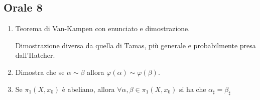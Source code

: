 \documentclass[]{article}
\begin{document}
\subsection{Orale 8}
\begin{enumerate}
    \item Teorema di Van-Kampen con enunciato e dimostrazione.
    \begin{answer}
        Dimostrazione diversa da quella di Tamas, pi\`u generale e probabilmente presa dall'Hatcher.
    \end{answer}
    \item Dimostra che se $\alpha \sim \beta$ allora $\varphi(\alpha) \sim \varphi(\beta)$.
    \item Se $\pi_1(X, x_0)$ \`e abeliano, allora $\forall \alpha, \beta \in \pi_1(X, x_0)$ si ha che $\alpha_{\sharp} = \beta_{\sharp}$
\end{enumerate}
\end{document}
